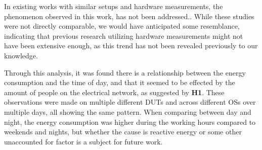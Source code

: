 In existing works with similar setups and hardware measurements, the phenomenon observed in this work, has not been addressed.\cite{georgiou2020energy,Koedijk2022diff, khan2018rapl}. While these studies were not directly comparable, we would have anticipated some resemblance, indicating that previous research utilizing hardware measurements might not have been extensive enough, as this trend has not been revealed previously to our knowledge.

Through this analysis, it was found there is a relationship between the energy consumption and the time of day, and that it seemed to be effected by the amount of people on the electrical network, as suggested by \textbf{H1}. These observations were made on multiple different DUTs and across different OSs over multiple days, all showing the same pattern. When comparing between day and night, the energy consumption was higher during the working hours compared to weekends and nights, but whether the cause is reactive energy or some other unaccounted for factor is a subject for future work.









